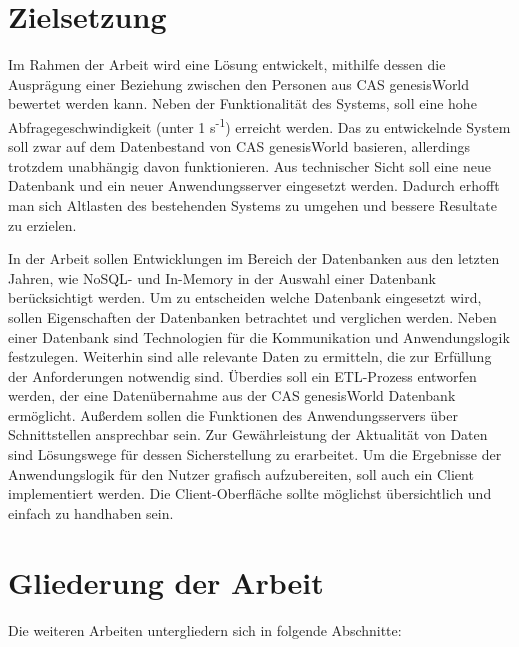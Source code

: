 \section{Zielsetzung}
\label{ch:Einfuehrung:sec:Zielsetzung}

Im Rahmen der Arbeit wird eine Lösung entwickelt, mithilfe dessen die Ausprägung einer Beziehung zwischen den Personen aus CAS genesisWorld bewertet werden kann. Neben der Funktionalität des Systems, soll eine hohe Abfragegeschwindigkeit (unter 1 s\textsuperscript{-1}) erreicht werden. Das zu entwickelnde System soll zwar auf dem Datenbestand von CAS genesisWorld basieren, allerdings trotzdem unabhängig davon funktionieren. Aus technischer Sicht soll eine neue Datenbank und ein neuer Anwendungsserver eingesetzt werden. Dadurch erhofft man sich Altlasten des bestehenden Systems zu umgehen und bessere Resultate zu erzielen. 

In der Arbeit sollen Entwicklungen im Bereich der Datenbanken aus den letzten Jahren, wie NoSQL- und In-Memory in der Auswahl einer Datenbank berücksichtigt werden. Um zu entscheiden welche Datenbank eingesetzt wird, sollen Eigenschaften der Datenbanken betrachtet und verglichen werden. Neben einer Datenbank sind Technologien für die Kommunikation und Anwendungslogik festzulegen. Weiterhin sind alle relevante Daten zu ermitteln, die zur Erfüllung der Anforderungen notwendig sind. Überdies soll ein ETL-Prozess entworfen werden, der eine Datenübernahme aus der CAS genesisWorld Datenbank ermöglicht. Außerdem sollen die Funktionen des Anwendungsservers über Schnittstellen ansprechbar sein. Zur Gewährleistung der Aktualität von Daten sind Lösungswege für dessen Sicherstellung zu erarbeitet. Um die Ergebnisse der Anwendungslogik für den Nutzer grafisch aufzubereiten, soll auch ein Client implementiert werden. Die Client-Oberfläche sollte möglichst übersichtlich und einfach zu handhaben sein.

\section{Gliederung der Arbeit}
\label{ch:Einfuehrung:sec:Gliederung}

Die weiteren Arbeiten untergliedern sich in folgende Abschnitte: 
 
